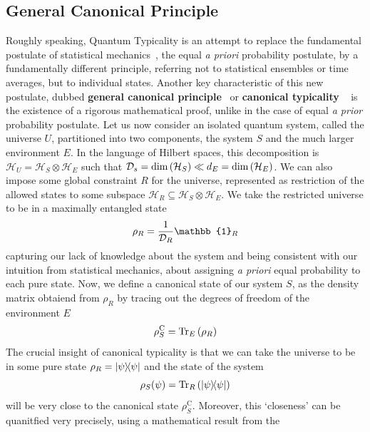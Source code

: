 \subsection{\label{sec:gcp} General Canonical Principle}
Roughly speaking, Quantum Typicality is an attempt to replace the fundamental postulate of statistical mechanics~\autocite{huang1987statistical},
the equal \textit{a priori} probability postulate, by a fundamentally different principle, referring not to
statistical ensembles or time averages, but to individual states. Another key characteristic of
this new postulate, dubbed \textbf{general canonical principle}~\autocite{Popescu2006} or \textbf{canonical typicality}
~\autocite{Goldstein2006} is the existence of a rigorous mathematical proof, unlike in the case of equal
 \textit{a prior} probability postulate. Let us now consider an isolated quantum system, called the universe \(U\), partitioned
 into two components, the system \(S\) and the much larger environment \(E\). In the language of Hilbert spaces, this decomposition is
 \(\mathcal{H}_U = \mathcal{H}_S \otimes \mathcal{H}_E\) such that \(\mathcal{D}_s = \mathrm{dim}\left(\mathcal{H}_S\right)
 \ll d_E = \mathrm{dim}\left(\mathcal{H}_E\right)\). We can also impose some global constraint \(R\) for the universe, represented
 as restriction of the allowed states to some subspace \(\mathcal{H}_R \subseteq  \mathcal{H}_S \otimes \mathcal{H}_E \).
 We take the restricted universe to be in a maximally entangled state
 \begin{equation}
	\rho_R = \frac{1}{\dimension_R} \mathbb{1}_R
 \end{equation}
capturing our lack of knowledge about the system and being consistent with our intuition from statistical mechanics, about assigning
\textit{a priori} equal probability to each pure state. Now, we define a canonical state of our system \(S\), as the density
matrix obtaiend from \(\rho_R\) by tracing out the degrees of freedom of the environment \(E\)
\begin{equation}
	\rho_S^{\mathrm{C}} = \Tr_E\left(\rho_R\right)
\end{equation}
The crucial insight of canonical typicality is that we can take the universe to be in some pure state \(\rho_R = \ketbra{\psi}{\psi}\)
and the state of the system 
\begin{equation}
	\rho_S(\psi) = \Tr_R \left(\ketbra{\psi}{\psi}\right)
\end{equation}
 will be very close to the canonical state
\(\rho_S^{\mathrm{C}}\). Moreover, this `closeness' can be quanitfied very precisely, using a mathematical result from the
